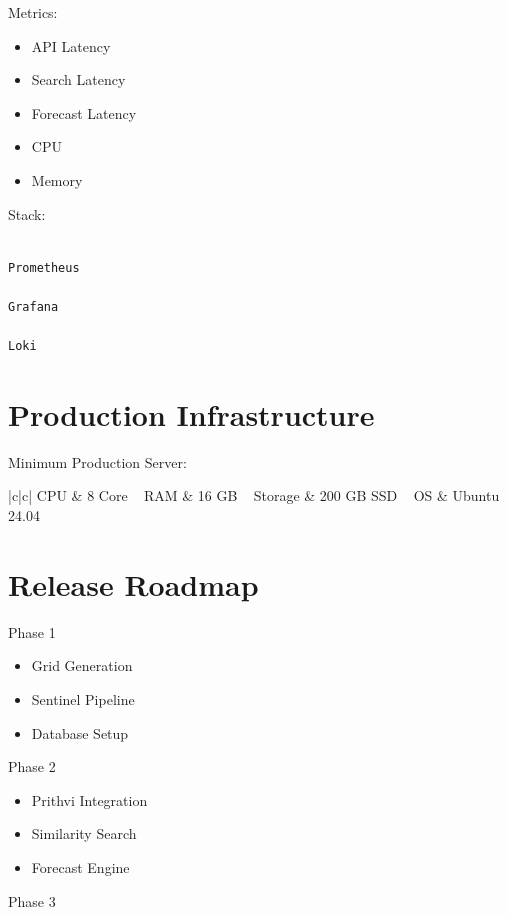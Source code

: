 \documentclass[11pt,a4paper]{article}
\begin{document}
Metrics:

\begin{itemize}
\item API Latency
\item Search Latency
\item Forecast Latency
\item CPU
\item Memory
\end{itemize}

Stack:

\begin{verbatim}

Prometheus

Grafana

Loki

\end{verbatim}

\section{Production Infrastructure}

Minimum Production Server:

\begin{tabular}{|c|c|}
\hline
CPU & 8 Core \
\hline
RAM & 16 GB \
\hline
Storage & 200 GB SSD \
\hline
OS & Ubuntu 24.04 \
\hline
\end{tabular}

\section{Release Roadmap}

Phase 1

\begin{itemize}
\item Grid Generation
\item Sentinel Pipeline
\item Database Setup
\end{itemize}

Phase 2

\begin{itemize}
\item Prithvi Integration
\item Similarity Search
\item Forecast Engine
\end{itemize}

Phase 3
\end{document}
